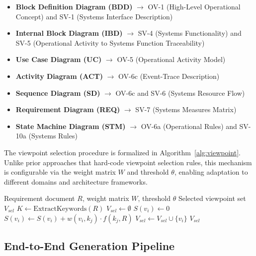 \documentclass{ieeeaccess}
\begin{document}
\begin{itemize}
    \item \textbf{Block Definition Diagram (BDD)} $\rightarrow$ OV-1 (High-Level Operational Concept) and SV-1 (Systems Interface Description)
    \item \textbf{Internal Block Diagram (IBD)} $\rightarrow$ SV-4 (Systems Functionality) and SV-5 (Operational Activity to Systems Function Traceability)
    \item \textbf{Use Case Diagram (UC)} $\rightarrow$ OV-5 (Operational Activity Model)
    \item \textbf{Activity Diagram (ACT)} $\rightarrow$ OV-6c (Event-Trace Description)
    \item \textbf{Sequence Diagram (SD)} $\rightarrow$ OV-6c and SV-6 (Systems Resource Flow)
    \item \textbf{Requirement Diagram (REQ)} $\rightarrow$ SV-7 (Systems Measures Matrix)
    \item \textbf{State Machine Diagram (STM)} $\rightarrow$ OV-6a (Operational Rules) and SV-10a (Systems Rules)
\end{itemize}

The viewpoint selection procedure is formalized in Algorithm~\ref{alg:viewpoint}. Unlike prior approaches that hard-code viewpoint selection rules, this mechanism is configurable via the weight matrix $W$ and threshold $\theta$, enabling adaptation to different domains and architecture frameworks.

\begin{algorithm}[t]
\caption{Context-Aware Viewpoint Selection}
\label{alg:viewpoint}
\begin{algorithmic}[1]
\REQUIRE Requirement document $R$, weight matrix $W$, threshold $\theta$
\ENSURE Selected viewpoint set $V_{sel}$
\STATE $K \leftarrow \text{ExtractKeywords}(R)$ 
\STATE $V_{sel} \leftarrow \emptyset$
    \STATE $S(v_i) \leftarrow 0$
        \STATE $S(v_i) \leftarrow S(v_i) + w(v_i, k_j) \cdot f(k_j, R)$
    \ENDFOR
        \STATE $V_{sel} \leftarrow V_{sel} \cup \{v_i\}$
    \ENDIF
\ENDFOR
\RETURN $V_{sel}$
\end{algorithmic}
\end{algorithm}

\subsection{End-to-End Generation Pipeline}
\end{document}
